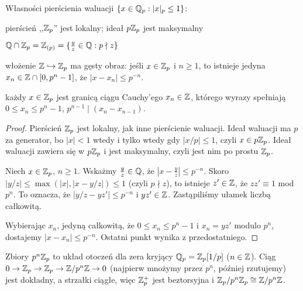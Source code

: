 \begin{fakt}
	Własności pierścienia waluacji $\{x \in \mathbb Q_p : |x|_p \le 1\}$:
	\begin{enumx}
		\item pierścień ,,$\mathbb Z_p$'' jest lokalny; ideał $p \mathbb Z_p$ jest maksymalny
		\item $\mathbb Q \cap \mathbb Z_p = \mathbb Z_{(p)} = \{\frac yz \in \mathbb Q: p \nmid z\}$
		\item włożenie $\mathbb Z \hookrightarrow \mathbb Z_p$ ma gęsty obraz: jeśli $x \in \mathbb Z_p$ i $n \ge 1$, to istnieje jedyna $x_n \in \mathbb Z \cap [0, p^n- 1]$, że $|x-x_n| \le p^{-n}$.
		\item każdy $x \in \mathbb Z_p$ jest granicą ciągu Cauchy'ego $x_n \in \mathbb Z$, którego wyrazy spełniają $0 \le x_n \le p^n-1$, $p^{n-1} \mid (x_n - x_{n-1})$.
	\end{enumx}
\end{fakt}

\begin{proof}
	Pierścień $\mathbb Z_p$ jest lokalny, jak inne pierścienie waluacji.
	Ideał waluacji ma $p$ za generator, bo $|x| < 1$ wtedy i tylko wtedy gdy $|x/p| \le 1$, czyli $x \in p\mathbb Z_p$.
	Ideał waluacji zawiera się w $p\mathbb Z_p$ i jest maksymalny, czyli jest nim po prostu $\mathbb Z_p$.

	Niech $x \in \mathbb Z_p$, $n \ge 1$.
	Wskażmy $\frac yz \in \mathbb Q$, że $|x-\frac yz| \le p^{-n}$.
	Skoro $|y/z| \le \max (|x|, |x-y/z|) \le 1$ (czyli $p \nmid z$), to istnieje $z' \in \mathbb Z$, że $zz' \equiv 1$ mod $p^n$.
	To oznacza, że $|y/z-yz'| \le p^{-n}$ i $yz' \in \mathbb Z$.
	Zastąpiliśmy ułamek liczbą całkowitą.

	Wybierając $x_n$, jedyną całkowitą, że $0 \le x_n \le p^n-1$ i $x_n = yz'$ modulo $p^n$, dostajemy $|x - x_n| \le p^{-n}$.
	Ostatni punkt wynika z przedostatniego.
\end{proof}

\begin{wniosek}
	Zbiory $p^n\mathbb Z_p$ to układ otoczeń dla zera kryjący $\mathbb Q_p = \mathbb Z_p[1/p]$ ($n \in \mathbb Z$).
	Ciąg $0 \to \mathbb Z_p \to \mathbb Z_p \to \mathbb Z/p^n\mathbb Z \to 0$ (najpierw mnożymy przez $p^n$, później rzutujemy) jest dokładny, a strzałki ciągłe, więc $\mathbb Z_p^+$ jest beztorsyjna i ${\mathbb Z_p}/{p^n \mathbb Z_p} \cong {\mathbb Z}/{p^n \mathbb Z}$.
\end{wniosek}
